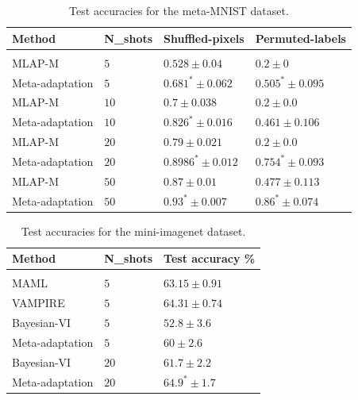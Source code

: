 \documentclass{article} %
\theoremstyle{definition}
\begin{document}
\begin{table}[t]	
	\caption{Test accuracies for the meta-MNIST dataset.}
	\label{table:gamma}
	\begin{center}
	\begin{tabular}{llll}
		Method   & N\_shots  & Shuffled-pixels & Permuted-labels  
  \\ \hline \\
		
		MLAP-M  & $5$   & $0.528\pm 0.04 $   & $0.2\pm 0 $   \\
		Meta-adaptation & $5$   & $0.681^*\pm 0.062 $ & $0.505^*\pm 0.095 $ \\
		\midrule
		MLAP-M  & $10$   & $0.7\pm 0.038 $   & $0.2\pm 0.0 $   \\
		Meta-adaptation & $10$   & $0.826^*\pm 0.016 $ & $0.461\pm 0.106 $ \\
		\midrule
		MLAP-M  & $20$   & $0.79\pm 0.021 $   & $0.2\pm 0.0 $   \\
		Meta-adaptation & $20$   & $0.8986^*\pm 0.012 $ & $0.754^*\pm 0.093 $ \\
		\midrule
		MLAP-M  & $50$   & $0.87\pm 0.01 $   & $0.477\pm 0.113 $   \\
		Meta-adaptation & $50$   & $0.93^*\pm 0.007 $ & $0.86^*\pm 0.074 $ \\
		\bottomrule
	\end{tabular}
        \end{center}
	
\end{table}

\begin{table}[t]	
	\caption{Test accuracies for the mini-imagenet dataset. }
	\label{table:inet}
	\centering
	\begin{tabular}{lll}
		
		Method   & N\_shots  & Test accuracy \% \\ \hline \\
		MAML \citep{Finn2017}& $5$   & $63.15 \pm 0.91 $      \\
		VAMPIRE \citep{nguyen2020} & $5$   & $64.31 \pm 0.74 $ \\
		Bayesian-VI & $5$   & $52.8\pm 3.6 $    \\
		Meta-adaptation & $5$   & $60\pm 2.6 $ \\
		\midrule
		Bayesian-VI & $20$   & $61.7\pm 2.2$     \\
		Meta-adaptation & $20$   & $64.9^* \pm 1.7 $  \\
		\midrule
	\end{tabular}
	
\end{table}
\end{document}
